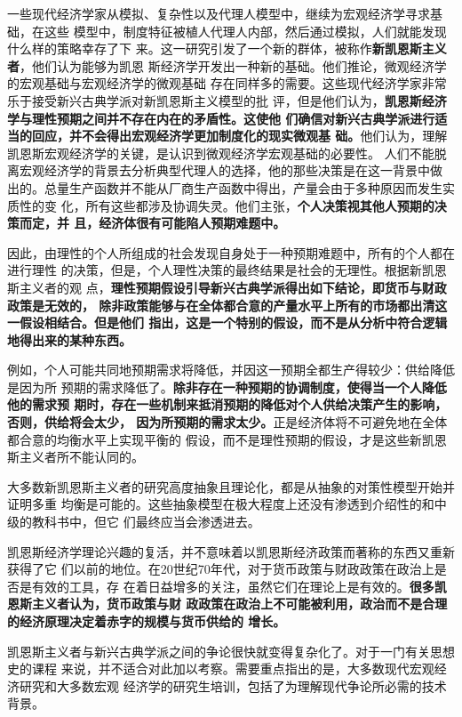 一些现代经济学家从模拟、复杂性以及代理人模型中，继续为宏观经济学寻求基础，在这些
模型中，制度特征被植人代理人内部，然后通过模拟，人们就能发现什么样的策略幸存了下
来。这一研究引发了一个新的群体，被称作\textbf{新凯恩斯主义者}，他们认为能够为凯恩
斯经济学开发出一种新的基础。他们推论，微观经济学的宏观基础与宏观经济学的微观基础
存在同样多的需要。这些现代经济学家非常乐于接受新兴古典学派对新凯恩斯主义模型的批
评，但是他们认为，\textbf{凯恩斯经济学与理性预期之间并不存在内在的矛盾性。这使他
  们确信对新兴古典学派进行适当的回应，并不会得出宏观经济学更加制度化的现实微观基
  础。}他们认为，理解凯恩斯宏观经济学的关键，是认识到微观经济学宏观基础的必要性。
人们不能脱离宏观经济学的背景去分析典型代理人的选择，他的那些决策是在这一背景中做
出的。总量生产函数并不能从厂商生产函数中得出，产量会由于多种原因而发生实质性的变
化，所有这些都涉及协调失灵。他们主张，\textbf{个人决策视其他人预期的决策而定，并
  且，经济体很有可能陷人预期难题中。}

因此，由理性的个人所组成的社会发现自身处于一种预期难题中，所有的个人都在进行理性
的决策，但是，个人理性决策的最终结果是社会的无理性。根据新凯恩斯主义者的观
点，\textbf{理性预期假设引导新兴古典学派得出如下结论，即货币与财政政策是无效的，
  除非政策能够与在全体都合意的产量水平上所有的市场都出清这一假设相结合。但是他们
  指出，这是一个特别的假设，而不是从分析中符合逻辑地得出来的某种东西。}

例如，个人可能共同地预期需求将降低，并因这一预期全都生产得较少：供给降低是因为所
预期的需求降低了。\textbf{除非存在一种预期的协调制度，使得当一个人降低他的需求预
  期时，存在一些机制来抵消预期的降低对个人供给决策产生的影响，否则，供给将会太少，
  因为所预期的需求太少。}正是经济体将不可避免地在全体都合意的均衡水平上实现平衡的
假设，而不是理性预期的假设，才是这些新凯恩斯主义者所不能认同的。

大多数新凯恩斯主义者的研究高度抽象且理论化，都是从抽象的对策性模型开始并证明多重
均衡是可能的。这些抽象模型在极大程度上还没有渗透到介绍性的和中级的教科书中，但它
们最终应当会渗透进去。

凯恩斯经济学理论兴趣的复活，并不意味着以凯恩斯经济政策而著称的东西又重新获得了它
们以前的地位。在20世纪70年代，对于货币政策与财政政策在政治上是否是有效的工具，存
在着日益增多的关注，虽然它们在理论上是有效的。\textbf{很多凯恩斯主义者认为，货币政策与财
政政策在政治上不可能被利用，政治而不是合理的经济原理决定着赤字的规模与货币供给的
增长。}

凯恩斯主义者与新兴古典学派之间的争论很快就变得复杂化了。对于一门有关思想史的课程
来说，并不适合对此加以考察。需要重点指出的是，大多数现代宏观经济研究和大多数宏观
经济学的研究生培训，包括了为理解现代争论所必需的技术背景。

